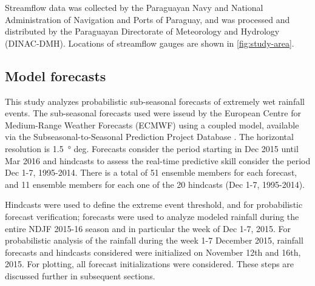\documentclass[twocol]{ametsoc}
\begin{document}
Streamflow data was collected by the Paraguayan Navy and National Administration of Navigation and Ports of Paraguay, and was processed and distributed by the Paraguayan Directorate of Meteorology and Hydrology (DINAC-DMH).
Locations of streamflow gauges are shown in \cref{fig:study-area}.

\subsection{Model forecasts}


This study analyzes probabilistic sub-seasonal forecasts of extremely wet rainfall events.
The sub-seasonal forecasts used were isseud by the European Centre for Medium-Range Weather Forecasts (ECMWF) using a coupled model, available via the Subseasonal-to-Seasonal Prediction Project Database \citep{Vitart2016}.
The horizontal resolution is \SI{1.5}{\degree} deg.
Forecasts consider the period starting in Dec 2015 until Mar 2016 and hindcasts to assess the real-time predictive skill consider the period Dec 1-7, 1995-2014.
There is a total of 51 ensemble members for each forecast, and 11 ensemble members for each one of the 20 hindcasts (Dec 1-7, 1995-2014).

Hindcasts were used to define the extreme event threshold, and for probabilistic forecast verification; forecasts were used to analyze modeled rainfall during the entire NDJF 2015-16 season and in particular the week of Dec 1-7, 2015.
For probabilistic analysis of the rainfall during the week 1-7 December 2015, rainfall forecasts and hindcasts considered were initialized on November 12th and 16th, 2015.
For plotting, all forecast initializations were considered.
These steps are discussed further in subsequent sections.

\end{document}
